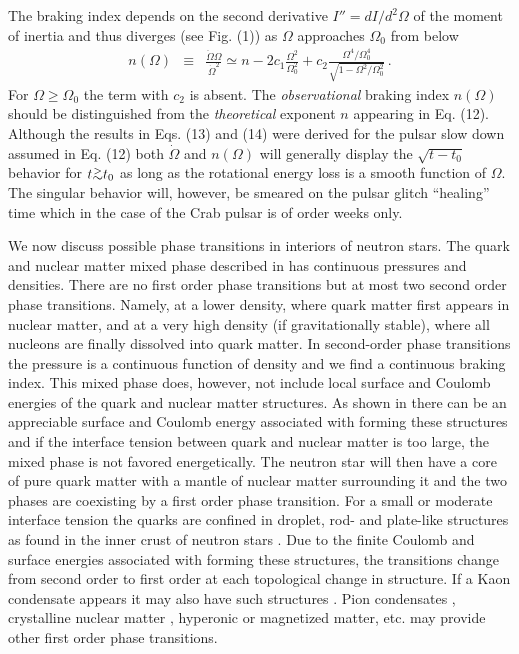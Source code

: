\begin{multicols}{2}
The braking index depends on the second derivative $I''=dI/d^2\Omega$
of the moment of inertia and thus diverges (see Fig. (1))
as $\Omega$ approaches $\Omega_0$ from below
\begin{eqnarray}
     n(\Omega) &\equiv& \frac{\ddot{\Omega}\Omega}{\dot{\Omega}^2} 
    \simeq n - 2c_1\frac{\Omega^2}{\Omega_0^2}
    +c_2\frac{\Omega^4/\Omega_0^4}{\sqrt{1-\Omega^2/\Omega_0^2}} \,.\label{n}
\end{eqnarray}
For $\Omega\ge\Omega_0$ the term with $c_2$ is absent.
The  {\it observational} braking index $n(\Omega)$ should be distinguished
from the {\it theoretical} exponent $n$ appearing in Eq. (12).
Although the results in Eqs. (13) and (14) were derived 
for the pulsar slow down assumed in Eq. (12) both
$\dot{\Omega}$ and $n(\Omega)$ will generally 
display the $\sqrt{t-t_0}$ behavior for $t\ga t_0$ as long as the rotational
energy loss is a smooth function of $\Omega$.
The singular behavior will, however, be smeared on the pulsar
glitch ``healing'' time which in the case of the Crab pulsar is 
of order weeks only.


We now discuss possible phase transitions in interiors of neutron
stars.  The quark and nuclear matter mixed phase described in
\cite{Glendenning} has continuous pressures and densities. There are
no first order phase transitions but at most two second order phase
transitions. Namely, at a lower density, where quark matter first
appears in nuclear matter, and at a very high density (if gravitationally
stable), where all nucleons are finally dissolved into quark matter.
In second-order
phase transitions the pressure is a continuous function of density
and we find a continuous braking
index.  This mixed phase does, however, not include local surface and
Coulomb energies of the quark and nuclear matter structures. As shown
in \cite{HPS,HH} there can be an appreciable surface and Coulomb
energy associated with forming these structures and if the interface
tension between quark and nuclear matter is too large, the mixed phase
is not favored energetically. The neutron star will then have a core
of pure quark matter with a mantle of nuclear matter surrounding it and
the two phases are coexisting by a first order phase transition.  For
a small or moderate interface tension the quarks are confined in
droplet, rod- and plate-like structures \cite{HPS,HH} as found in the
inner crust of neutron stars \cite{LPR}. 
Due to the finite Coulomb and
surface energies associated with forming these structures, the
transitions change from second order to first order at each
topological change in structure. 
If a Kaon condensate
appears it may also have such structures \cite{Schaffner}.
Pion condensates \cite{pion}, crystalline nuclear matter \cite{vijay},
hyperonic or magnetized matter, etc. may provide
other first order phase transitions.


\end{multicols}
